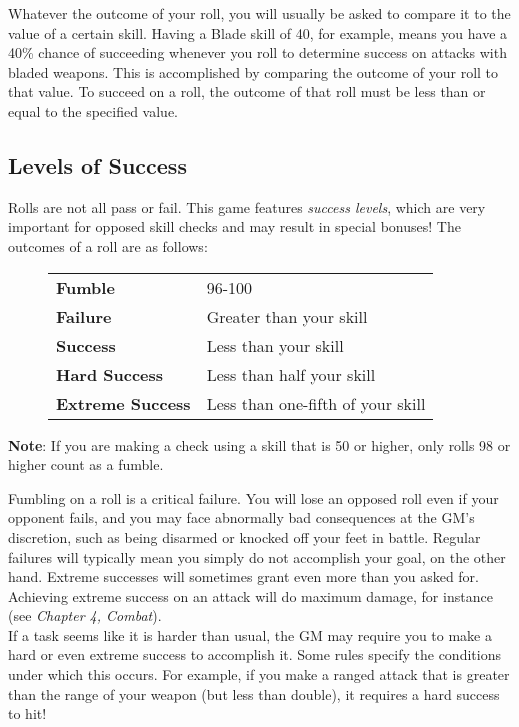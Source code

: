 Whatever the outcome of your roll, you will usually be asked to compare it to the value of a certain skill. Having a Blade skill of 40, for example, means you have a 40\% chance of succeeding whenever you roll to determine success on attacks with bladed weapons. This is accomplished by comparing the outcome of your roll to that value. To succeed on a roll, the outcome of that roll must be less than or equal to the specified value.

\subsection{Levels of Success}
Rolls are not all pass or fail. This game features \textit{success levels}, which are very important for opposed skill checks and may result in special bonuses! The outcomes of a roll are as follows:

\begin{figure}[h]
\begin{tabular}{p{}p{}}
	\textbf{Fumble} & 96-100\\
	\textbf{Failure} & Greater than your skill\\
	\textbf{Success} & Less than your skill\\
	\textbf{Hard Success} & Less than half your skill\\
	\textbf{Extreme Success} & Less than one-fifth of your skill\\
\end{tabular}
\end{figure}

\begin{tcolorbox}
	\textbf{Note}: If you are making a check using a skill that is 50 or higher, only rolls 98 or higher count as a fumble.
\end{tcolorbox}

Fumbling on a roll is a critical failure. You will lose an opposed roll even if your opponent fails, and you may face abnormally bad consequences at the GM's discretion, such as being disarmed or knocked off your feet in battle. Regular failures will typically mean you simply do not accomplish your goal, on the other hand. Extreme successes will sometimes grant even more than you asked for. Achieving extreme success on an attack will do maximum damage, for instance (see \textit{Chapter 4, Combat}).\\

If a task seems like it is harder than usual, the GM may require you to make a hard or even extreme success to accomplish it. Some rules specify the conditions under which this occurs. For example, if you make a ranged attack that is greater than the range of your weapon (but less than double), it requires a hard success to hit!

